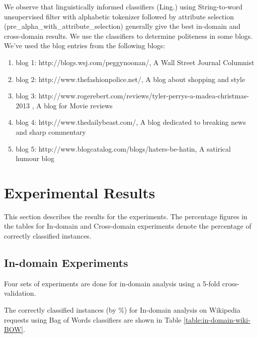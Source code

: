 \documentclass[conference]{IEEEtran}
\begin{document}
We observe that linguistically informed classifiers (Ling.) using String-to-word unsupervised filter with alphabetic tokenizer followed by attribute selection (pre\_alpha\_with\_attribute\_selection) generally give the best in-domain and cross-domain results. We use the classifiers to determine politeness in some blogs. We've used the blog entries from the following blogs:
\begin{enumerate}
\item blog 1: http://blogs.wsj.com/peggynoonan/, A Wall Street Journal Columnist
\item blog 2: http://www.thefashionpolice.net/, A blog about shopping and style
\item blog 3: http://www.rogerebert.com/reviews/tyler-perrys-a-madea-christmas-2013 , A blog for Movie reviews
\item blog 4: http://www.thedailybeast.com/, A blog dedicated to breaking news and sharp commentary
\item blog 5: http://www.blogcatalog.com/blogs/haters-be-hatin, A satirical humour blog 
\end{enumerate}


\section{Experimental Results}

This section describes the results for the experiments. The percentage figures in the tables for In-domain and Cross-domain experiments denote the percentage of correctly classified instances.

\subsection{In-domain Experiments}
Four sets of experiments are done for in-domain analysis using a 5-fold cross-validation. 

The correctly classified instances (by \%) for In-domain analysis on Wikipedia requests using Bag of Words classifiers are shown in Table \ref{table:in-domain-wiki-BOW}.
\end{document}
